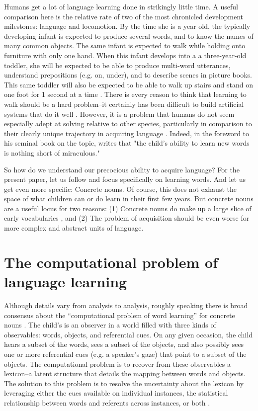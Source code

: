 \documentclass[review]{elsarticle}
\begin{document}
Humans get a lot of language learning done in strikingly little time. A useful comparison here is the relative rate of two of the most chronicled development milestones: language and locomotion. By the time she is a year old, the typically developing infant is expected to produce several words, and to know the names of many common objects. The same infant is expected to walk while holding onto furniture with only one hand. When this infant develops into a a three-year-old toddler, she will be expected to be able to produce multi-word utterances, understand prepositions (e.g. on, under), and to describe scenes in picture books. This same toddler will also be expected to be able to walk up stairs and stand on one foot for 1 second at a time \citep{squires2009}. There is every reason to think that learning to walk should be a hard problem--it certainly has been difficult to build artificial systems that do it well \citep[e.g][]{collins2005}. However, it is a problem that humans do not seem especially adept at solving relative to other species, particularly in comparison to their clearly unique trajectory in acquiring language \citep{capaday2002,garwicz2009,hockett1959}. Indeed, in the foreword to his seminal book on the topic, \cite{bloom2000} writes that "the child's ability to learn new words is nothing short of miraculous."

So how do we understand our precocious ability to acquire language? For the present paper, let us follow \cite{bloom2000} and focus specifically on learning words. And let us get even more specific: Concrete nouns. Of course, this does not exhaust the space of what children can or do learn in their first few years. But concrete nouns are a useful locus for two reasons: (1) Concrete nouns do make up a large slice of early vocabularies \citep{caselli1995, gentner1982}, and (2) The problem of acquisition should be even worse for more complex and abstract units of language.

\section{The computational problem of language learning}

Although details vary from analysis to analysis, roughly speaking there is broad consensus about the ``computational problem of word learning'' for concrete nouns \citep{marr1982}. The child's is an observer in a world filled with three kinds of observables: words, objects, and referential cues. On any given occasion, the child hears a subset of the words, sees a subset of the objects, and also possibly sees one or more referential cues (e.g. a speaker's gaze) that point to a subset of the objects. The computational problem is to recover from these observables a lexicon--a latent structure that details the mapping between words and objects. The solution to this problem is to resolve the uncertainty about the lexicon by leveraging either the cues available on individual instances, the statistical relationship between words and referents across instances, or both \citep[e.g.,][etc.]{blythe2010, frank2013, kachergis2012, mcmurray2012, siskind1996, yu2008, yurovsky2014}. 
\end{document}
